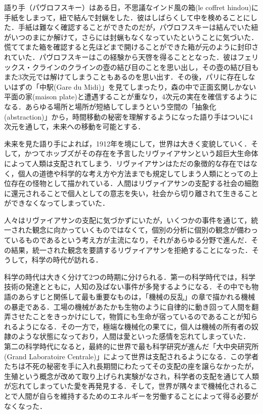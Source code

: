 語り手（パヴロフスキー）はある日，不思議なインド風の箱(le coffret hindou)に手紙をしまって，紐で結んで封蝋をした．彼はしばらくして中を検めることにした．手紙は難なく確認することができたのだが，パヴロフスキーは結んでいた紐がいつのまにか解けて，さらには封蝋もなくなっていたということに気づいた．慌ててまた箱を確認すると先ほどまで開けることができた箱が元のように封印されていた．パヴロフスキーはこの経験から天啓を得ることとなった．彼はフェリックス・クラインのクラインの壺の結び目のことを思い出し，その壺の結び目もまた3次元では解けてしまうこともあるのを思い出す．その後，パリに存在しないはずの「中駅(Gare du Midi)」を見てしまったり，森の中で正面玄関しかない平面の家(maison plate)と遭遇することが重なり，4次元の実在を確信するようになる．あらゆる場所と場所が短絡してしまうという空間の「抽象化(abstraction)」から，時間移動の秘密を理解するようになった語り手はついに4次元を通して，未来への移動を可能とする．

未来を見た語り手によれば，1912年を境にして，世界は大きく変貌していく．そして，かつてホッブズがその存在を予言したリヴァイアサンという超巨大生命体によって人類は支配されてしまう．リヴァイアサンはただの象徴的な存在ではなく，個人の道徳や科学的な考え方や方法までも規定してしまう人類にとっての上位存在の怪物として描かれている．人間はリヴァイアサンの支配する社会の細胞に還元されることで個人としての意志を失い，社会から切り離されて生きることができなくなってしまっていた．

人々はリヴァイアサンの支配に気づかずにいたが，いくつかの事件を通じて，統一された観念に向かっていくものではなくて，個別の分析に個別の観念が備わっているものであるという考え方が主流になり，それがあらゆる分野で進んだ．その結果，統一された観念を要請するリヴァイアサンを拒絶することになった．そうして，科学の時代が訪れる．

科学の時代は大きく分けて2つの時期に分けられる．第一の科学時代では，科学技術の発達とともに，人知の及ばない事件が多発するようになる．その中でも物語のあらすじと関係して最も重要なものは，「機械の反乱」の章で描かれる機械の暴走である．工場の機械があたかも生物のように自律的に動き回って人間を翻弄させたことをきっかけにして，物質にも生命が宿っているのであることが知られるようになる．その一方で，極端な機械化の果てに，個人は機械の所有者の奴隷のような状態になっており，人間は愛といった感情を忘れてしまっていた． 第二の科学時代になると，最終的に世界で最も科学研究が進んだ「大中央研究所(Grand Laboratoire Centrale)」によって世界は支配されるようになる．この学者たちは不死の秘密を手に入れ長期間にわたってその支配の座を譲らなかったが，生殖という概念が改めて取り上げられ実験がなされ，科学者の支配を通じて人類が忘れてしまっていた愛を再発見する．そして，世界が隅々まで機械化されることで人間が自らを維持するためのエネルギーを労働することによって得る必要がなくなった．

